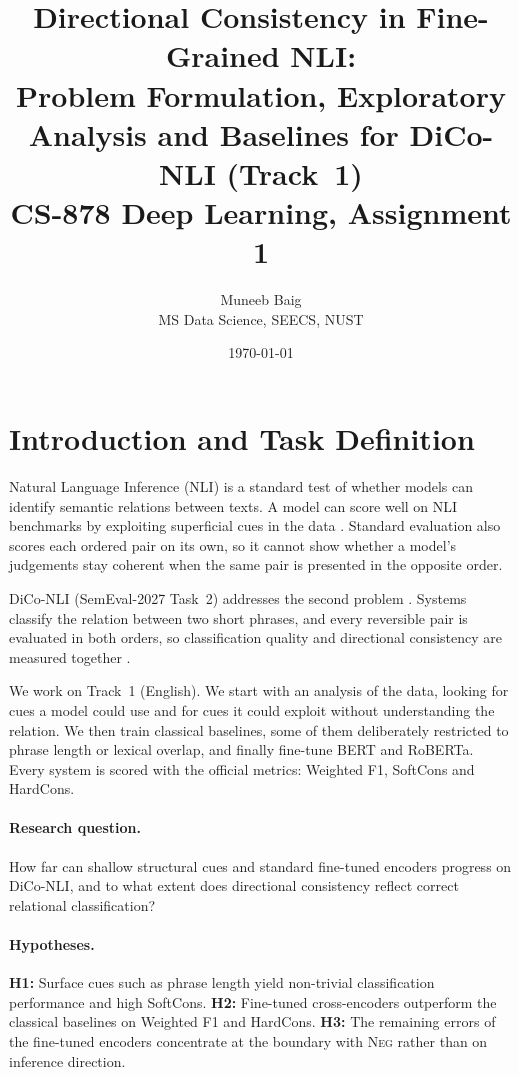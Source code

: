 \documentclass[11pt,a4paper]{article}
\title{Directional Consistency in Fine-Grained NLI:\\
Problem Formulation, Exploratory Analysis and Baselines for DiCo-NLI (Track~1)\\[4pt]
\large CS-878 Deep Learning, Assignment 1}
\author{Muneeb Baig\\ MS Data Science, SEECS, NUST}
\date{\today}
\newcommand{\NEG}{\textsc{Neg}}
\begin{document}
\maketitle

\section{Introduction and Task Definition}
\label{sec:intro}

Natural Language Inference (NLI) is a standard test of whether models can identify semantic relations between texts. A model can score well on NLI benchmarks by exploiting superficial cues in the data \citep{gururangan2018annotation}. Standard evaluation also scores each ordered pair on its own, so it cannot show whether a model's judgements stay coherent when the same pair is presented in the opposite order.

DiCo-NLI (SemEval-2027 Task~2) addresses the second problem \citep{diconli2026}. Systems classify the relation between two short phrases, and every reversible pair is evaluated in both orders, so classification quality and directional consistency are measured together \citep{apaolaza2026assessing}.

We work on Track~1 (English). We start with an analysis of the data, looking for cues a model could use and for cues it could exploit without understanding the relation. We then train classical baselines, some of them deliberately restricted to phrase length or lexical overlap, and finally fine-tune BERT and RoBERTa. Every system is scored with the official metrics: Weighted F1, SoftCons and HardCons.

\paragraph{Research question.} How far can shallow structural cues and standard fine-tuned encoders progress on DiCo-NLI, and to what extent does directional consistency reflect correct relational classification?

\paragraph{Hypotheses.}
\textbf{H1:} Surface cues such as phrase length yield non-trivial classification performance and high SoftCons.
\textbf{H2:} Fine-tuned cross-encoders outperform the classical baselines on Weighted F1 and HardCons.
\textbf{H3:} The remaining errors of the fine-tuned encoders concentrate at the boundary with \NEG{} rather than on inference direction.
\end{document}
